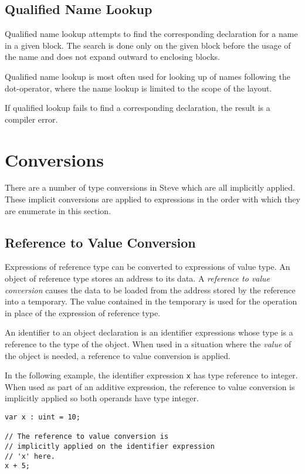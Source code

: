 \subsection{Qualified Name Lookup} \label{qlfd_lookup}

Qualified name lookup attempts to find the corresponding declaration for a name in a given block. The search is done only on the given block before the usage of the name and does not expand outward to enclosing blocks.

Qualified name lookup is most often used for looking up of names following the dot-operator, where the name lookup is limited to the scope of the layout.

If qualified lookup fails to find a corresponding declaration, the result is a compiler error.

\section{Conversions} \label{conversions_guide}

There are a number of type conversions in Steve which are all implicitly applied. These implicit conversions are applied to expressions in the order with which they are enumerate in this section.

\subsection{Reference to Value Conversion} \label{reftoval_conv}

Expressions of reference type can be converted to expressions of value type. An object of reference type stores an address to its data. A \textit{reference to value conversion} causes the data to be loaded from the address stored by the reference into a temporary. The value contained in the temporary is used for the operation in place of the expression of reference type.

An identifier to an object declaration is an identifier expressions whose type is a reference to the type of the object. When used in a situation where the \textit{value} of the object is needed, a reference to value conversion is applied.

In the following example, the identifier expression \texttt{x} has type reference to integer. When used as part of an additive expression, the reference to value conversion is implicitly applied so both operands have type integer.

\begin{minip}
\begin{lstlisting}
var x : uint = 10;

// The reference to value conversion is
// implicitly applied on the identifier expression
// 'x' here.
x + 5;
\end{lstlisting}
\end{minip}

